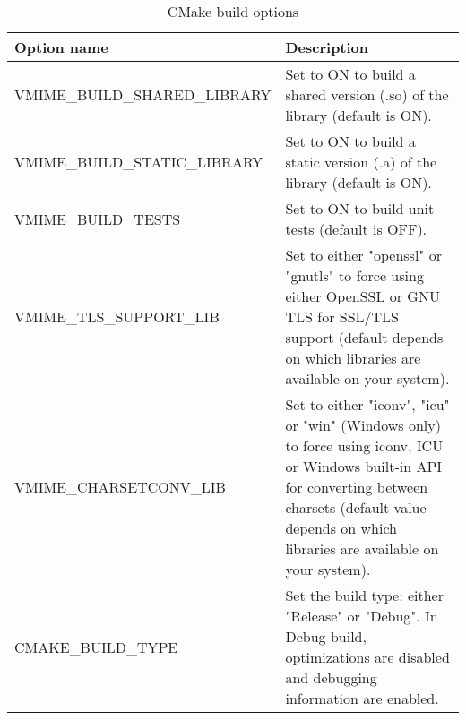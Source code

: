 \begin{table}[!ht]
\noindent\begin{tabularx}{1.0\textwidth}{|l|X|}
\hline
	{\bf Option name} &
	{\bf Description} \\
\hline
\hline
VMIME\_BUILD\_SHARED\_LIBRARY &
Set to ON to build a shared version (.so) of the library (default is ON). \\
\hline
VMIME\_BUILD\_STATIC\_LIBRARY &
Set to ON to build a static version (.a) of the library (default is ON). \\
\hline
VMIME\_BUILD\_TESTS &
Set to ON to build unit tests (default is OFF). \\
\hline
VMIME\_TLS\_SUPPORT\_LIB &
Set to either "openssl" or "gnutls" to force using either OpenSSL or GNU TLS
for SSL/TLS support (default depends on which libraries are available on
your system). \\
\hline
VMIME\_CHARSETCONV\_LIB &
Set to either "iconv", "icu" or "win" (Windows only) to force using iconv, ICU
or Windows built-in API for converting between charsets (default value depends
on which libraries are available on your system). \\
\hline
CMAKE\_BUILD\_TYPE &
Set the build type: either "Release" or "Debug". In Debug build, optimizations
are disabled and debugging information are enabled. \\
\hline
\end{tabularx}
\caption{CMake build options}
\end{table}
